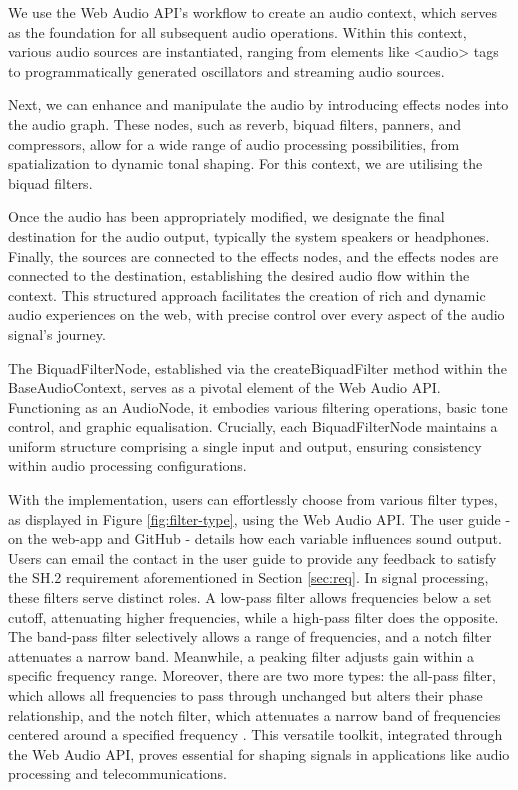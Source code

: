 \documentclass{l4proj}
\begin{document}
We use the Web Audio API's workflow to create an audio context, which serves as the foundation for all subsequent audio operations. Within this context, various audio sources are instantiated, ranging from elements like <audio> tags to programmatically generated oscillators and streaming audio sources.

Next, we can enhance and manipulate the audio by introducing effects nodes into the audio graph. These nodes, such as reverb, biquad filters, panners, and compressors, allow for a wide range of audio processing possibilities, from spatialization to dynamic tonal shaping. For this context, we are utilising the biquad filters. 

Once the audio has been appropriately modified, we designate the final destination for the audio output, typically the system speakers or headphones. Finally, the sources are connected to the effects nodes, and the effects nodes are connected to the destination, establishing the desired audio flow within the context. This structured approach facilitates the creation of rich and dynamic audio experiences on the web, with precise control over every aspect of the audio signal's journey.

The BiquadFilterNode, established via the createBiquadFilter method within the BaseAudioContext, serves as a pivotal element of the Web Audio API. Functioning as an AudioNode, it embodies various filtering operations, basic tone control, and graphic equalisation. Crucially, each BiquadFilterNode maintains a uniform structure comprising a single input and output, ensuring consistency within audio processing configurations.

With the implementation, users can effortlessly choose from various filter types, as displayed in Figure \ref{fig:filter-type}, using the Web Audio API. The user guide - on the web-app and GitHub - details how each variable influences sound output. Users can email the contact in the user guide to provide any feedback to satisfy the SH.2 requirement aforementioned in Section \ref{sec:req}. In signal processing, these filters serve distinct roles. A low-pass filter allows frequencies below a set cutoff, attenuating higher frequencies, while a high-pass filter does the opposite. The band-pass filter selectively allows a range of frequencies, and a notch filter attenuates a narrow band. Meanwhile, a peaking filter adjusts gain within a specific frequency range. Moreover, there are two more types: the all-pass filter, which allows all frequencies to pass through unchanged but alters their phase relationship, and the notch filter, which attenuates a narrow band of frequencies centered around a specified frequency \citep{MozDevNet_filters}. This versatile toolkit, integrated through the Web Audio API, proves essential for shaping signals in applications like audio processing and telecommunications. 
\end{document}
